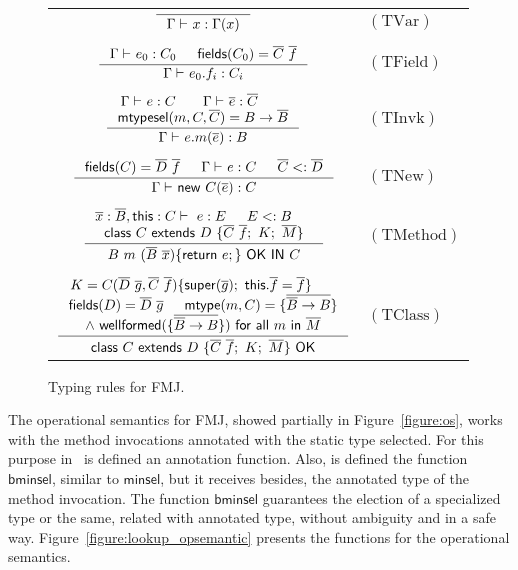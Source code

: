 \documentclass[hidelinks, twocolumn]{article}
\newcommand\rulename[1]{\mathrm{(#1)}}
\newcommand{\env}{{\Gamma \vdash \ }}
\newcommand{\clases}[1][D]{\mathsf{class} \ C \ \mathsf{extends} \ #1 \ \{ \overline{C} \ \overline{f}; \ K; \ \overline{M}\}}
\newcommand{\metodo}[1][C]{#1 \ m \ (\overline{#1} \ \overline{x})\{\mathsf{return} \ e;\}}
\newcommand{\mtypesel}{\mathsf{mtypesel} (m, C, \overline{C})}
\newcommand{\mtype}[1][C]{\mathsf{mtype} (m, #1)}
\newcommand{\fields}[1][C]{\mathsf{fields} (#1)}
\newcommand{\wellformed}[1][B]{\mathsf{wellformed} (\{\overline {\overline{#1} \to #1}\})}
\begin{document}
\begin{figure}[h]
\begin{small}
\begin{center}
\setlength{\tabcolsep}{1pt}
\begin{tabular}{c l}
$\inference{}{\env x : \Gamma(x)}$&$\rulename{TVar}$\\
&\\
$\inference{\env e_0 : C_0 & \fields[C_0] = \overline{C} \ \overline{f}}{\env e_0.f_i : C_i}$&$\rulename{TField}$\\
&\\
$\inference{\env e:C & \env \overline{e} : \overline{C} & \\ \mtypesel = B \to \overline{B}}{\env e.m(\overline{e}) : B} $&$\rulename{TInvk}$\\
&\\
$\inference{\fields = \overline{D} \ \overline{f} & \env e : C & \overline{C} <: \overline{D}}{\env \mathsf{new} \ C(\overline{e}) : C }$&$\rulename{TNew}$\\
&\\
$\inference{\overline{x} : \overline{B}, \mathsf{this} : C \vdash \ e:E & E <: B & \\  \clases}{\metodo[B] \ \mathsf{OK \ IN} \ C} $&$\rulename{TMethod}   $\\
&\\
$\inference{K = C(\overline{D} \ \overline{g}, \overline{C} \ \overline{f}) \{ \mathsf{super}(\overline{g});  \ \mathsf{this}.\overline{f} = \overline{f} \} & \\ \fields[D] = \overline{D} \ \overline{g} & \mtype = \{ \overline{\overline{B} \to B}\} \\
\land  \ \wellformed \ \mathsf{for \ all} \ m \ \mathsf{in} \ \overline{M}} {\clases \ \mathsf{OK}}$&$\rulename{TClass}$\\
\end{tabular}
\caption{Typing rules for FMJ.}
\label{figure:typingrules}
\end{center}
\end{small}
\end{figure}

The operational semantics for FMJ, showed partially in Figure~\ref{figure:os}, works with the method invocations annotated with the static type selected. For this purpose in~\cite{BETTINI2009261} is defined an annotation function.	Also, is defined the function $\mathsf{bminsel}$, similar to $\mathsf{minsel}$, but it receives besides, the annotated type of the method invocation. The function $\mathsf{bminsel}$ guarantees the election of a specialized type or the same, related with annotated type, without ambiguity and in a safe way. Figure~\ref{figure:lookup_opsemantic} presents the  functions for the operational semantics.
\end{document}
